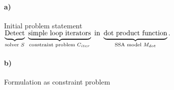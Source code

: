 
\paragraph*{a)} Initial problem statement\\[-1em]

\centering
{\LARGE$\underbrace{\text{Detect\vphantom{p}}}
                  _{\text{solver }S}
      \ \underbrace{\text{simple loop iterators}}
                  _{\text{constraint problem }C_{iter}}
                  \ \text{in}
      \ \underbrace{\text{dot product function}}
                  _{\text{SSA model }M_{dot}}
                    \text{.}$}\\[2em]

\raggedright
\paragraph*{b)} Formulation as constraint problem\\[1em]

